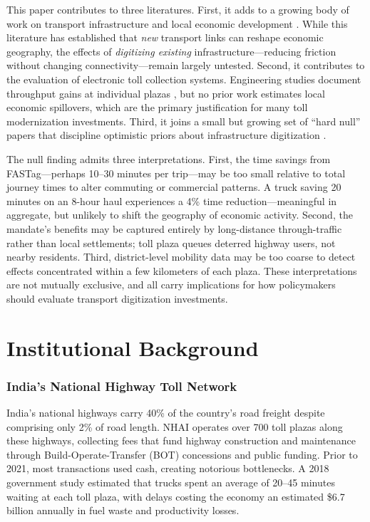 \documentclass[12pt]{article}
\begin{document}
This paper contributes to three literatures. First, it adds to a growing body of work on transport infrastructure and local economic development \citep{donaldson2018railroads, faber2014trade, asher2020rural, ghani2016highways, storeygard2016farther}. While this literature has established that \textit{new} transport links can reshape economic geography, the effects of \textit{digitizing existing} infrastructure---reducing friction without changing connectivity---remain largely untested. Second, it contributes to the evaluation of electronic toll collection systems. Engineering studies document throughput gains at individual plazas \citep{ozbay2006estimation, burris2003impact}, but no prior work estimates local economic spillovers, which are the primary justification for many toll modernization investments. Third, it joins a small but growing set of ``hard null'' papers that discipline optimistic priors about infrastructure digitization \citep{muralidharan2021identity, banerjee2020can}.

The null finding admits three interpretations. First, the time savings from FASTag---perhaps 10--30 minutes per trip---may be too small relative to total journey times to alter commuting or commercial patterns. A truck saving 20 minutes on an 8-hour haul experiences a 4\% time reduction---meaningful in aggregate, but unlikely to shift the geography of economic activity. Second, the mandate's benefits may be captured entirely by long-distance through-traffic rather than local settlements; toll plaza queues deterred highway users, not nearby residents. Third, district-level mobility data may be too coarse to detect effects concentrated within a few kilometers of each plaza. These interpretations are not mutually exclusive, and all carry implications for how policymakers should evaluate transport digitization investments.

\section{Institutional Background}

\subsubsection*{India's National Highway Toll Network} India's national highways carry 40\% of the country's road freight despite comprising only 2\% of road length. NHAI operates over 700 toll plazas along these highways, collecting fees that fund highway construction and maintenance through Build-Operate-Transfer (BOT) concessions and public funding. Prior to 2021, most transactions used cash, creating notorious bottlenecks. A 2018 government study estimated that trucks spent an average of 20--45 minutes waiting at each toll plaza, with delays costing the economy an estimated \$6.7 billion annually in fuel waste and productivity losses.
\end{document}
